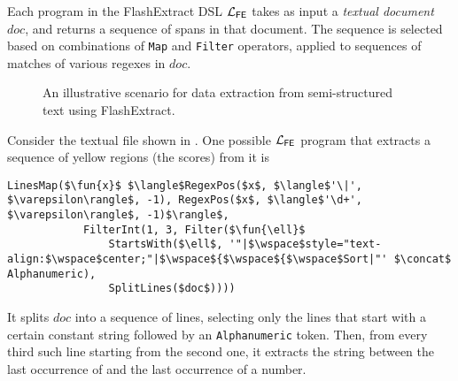 Each program in the FlashExtract DSL $\mathcal{L}_{\mathsf{FE}}$ takes as input a \emph{textual document} $doc$, and returns a sequence
of spans in that document.
The sequence is selected based on combinations of \texttt{Map} and \texttt{Filter} operators, applied to sequences of
matches of various regexes in $doc$.

\begin{sidewaysfigure}[p!]
    \centering
    \uwsinglespace
    \begin{tcbraster}[beamer, raster columns=1, size=minimal]
    \end{tcbraster}
    \caption{An illustrative scenario for data extraction from semi-structured text using FlashExtract.}
    \label{fig:example:flashextract}
\end{sidewaysfigure}

\begin{example}
    \label{ex:background:fe}
    Consider the textual file shown in .
    One possible $\mathcal{L}_{\mathsf{FE}}$ program that extracts a sequence of yellow regions (the scores) from it is
    \begin{lstlisting}[language=dsl, gobble=8]
        LinesMap($\fun{x}$ $\langle$RegexPos($x$, $\langle$'\|', $\varepsilon\rangle$, -1), RegexPos($x$, $\langle$'\d+', $\varepsilon\rangle$, -1)$\rangle$,
            FilterInt(1, 3, Filter($\fun{\ell}$
                StartsWith($\ell$, '"|$\wspace$style="text-align:$\wspace$center;"|$\wspace${$\wspace${$\wspace$Sort|"' $\concat$ Alphanumeric),
                SplitLines($doc$))))
    \end{lstlisting}
    It splits $doc$ into a sequence of lines, selecting only the lines that start with a certain constant string
    followed by an \texttt{Alphanumeric} token.
    Then, from every third such line starting from the second one, it extracts the string between the last occurrence of
    \stringliteral{|} and the last occurrence of a number.
\end{example}

